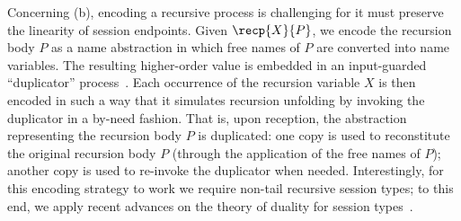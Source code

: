 Concerning (b), encoding a recursive process  is  challenging for 
it must preserve the linearity of session endpoints. 
Given $\recp{X}{P}$, 
we encode the recursion body $P$ as a name abstraction
in which free names of $P$ are converted into name variables.
The resulting higher-order value is embedded in an input-guarded 
``duplicator'' process~\cite{ThomsenB:plachoasgcfhop}.
Each occurrence of the recursion variable $X$ is then encoded 
in such a way that it
simulates recursion unfolding by 
invoking the duplicator in a by-need fashion.
That is, upon reception, the abstraction representing the 
recursion body $P$
is duplicated: 
one copy is used to reconstitute the original recursion body $P$ (through
the application of the free names of $P$); 
another copy is used to re-invoke the duplicator when needed. 
Interestingly, for this encoding strategy to work 
we require non-tail recursive session types; to this end, 
we apply recent advances on the theory of duality for session types~\cite{TGC14,DBLP:journals/corr/abs-1202-2086}.

%
%
%
%

